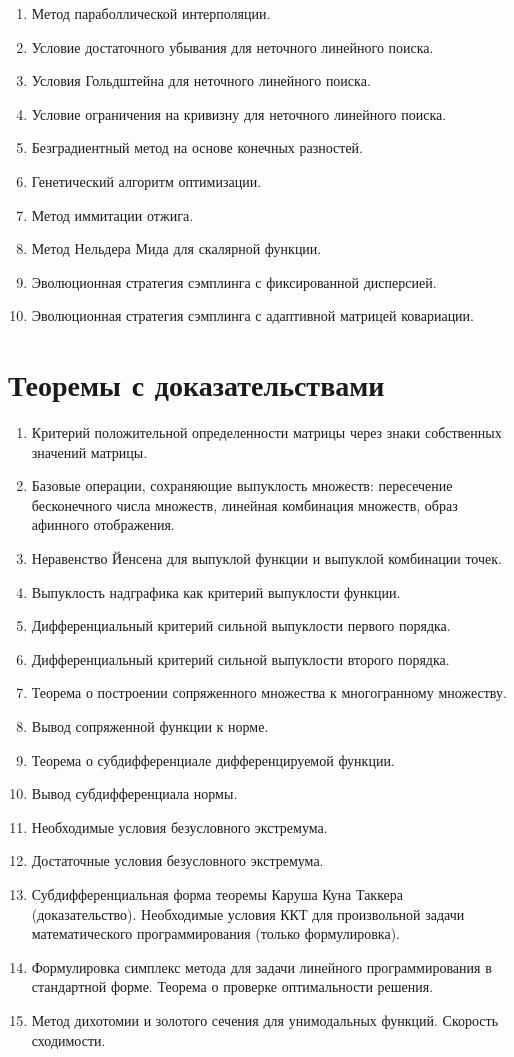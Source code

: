 \documentclass[11pt]{article}
\begin{document}
\begin{enumerate}
    \item Метод параболлической интерполяции.
    \item Условие достаточного убывания для неточного линейного поиска.
    \item Условия Гольдштейна для неточного линейного поиска.
    \item Условие ограничения на кривизну для неточного линейного поиска.
    \item Безградиентный метод на основе конечных разностей.
    \item Генетический алгоритм оптимизации.
    \item Метод иммитации отжига.
    \item Метод Нельдера Мида для скалярной функции.
    \item Эволюционная стратегия сэмплинга с фиксированной дисперсией.
    \item Эволюционная стратегия сэмплинга с адаптивной матрицей ковариации.
\end{enumerate}
\section*{Теоремы с доказательствами}

\begin{enumerate}
    \setlength\itemsep{-0.3em}
    \item Критерий положительной определенности матрицы через знаки собственных значений матрицы.
    \item Базовые операции, сохраняющие выпуклость множеств: пересечение бесконечного числа множеств, линейная комбинация множеств, образ афинного отображения.
    \item Неравенство Йенсена для выпуклой функции и выпуклой комбинации точек.
    \item Выпуклость надграфика как критерий выпуклости функции.
    \item Дифференциальный критерий сильной выпуклости первого порядка.
    \item Дифференциальный критерий сильной выпуклости второго порядка.
    \item Теорема о построении сопряженного множества к многогранному множеству.
    \item Вывод сопряженной функции к норме.
    \item Теорема о субдифференциале дифференцируемой функции.
    \item Вывод субдифференциала нормы.
    \item Необходимые условия безусловного экстремума.
    \item Достаточные условия безусловного экстремума.
    \item Субдифференциальная форма теоремы Каруша Куна Таккера (доказательство). Необходимые условия ККТ для произвольной задачи математического программирования (только формулировка).
    \item Формулировка симплекс метода для задачи линейного программирования в стандартной форме. Теорема о проверке оптимальности решения.
    \item Метод дихотомии и золотого сечения для унимодальных функций. Скорость сходимости.
\end{enumerate}
\end{document}
